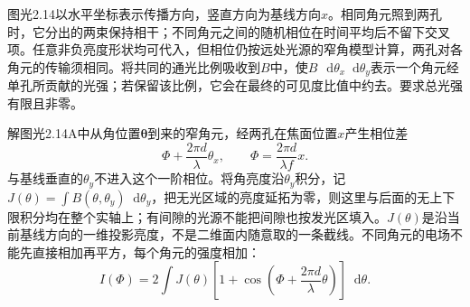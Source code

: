 \documentclass[UTF8,fontset=fandol,a4paper,11pt]{ctexart}
\newcommand{\dd}{\mathop{}\!\mathrm{d}}
\begin{document}
图光2.14以水平坐标表示传播方向，竖直方向为基线方向$x$。相同角元照到两孔时，它分出的两束保持相干；不同角元之间的随机相位在时间平均后不留下交叉项。任意非负亮度形状均可代入，但相位仍按远处光源的窄角模型计算，两孔对各角元的传输须相同。将共同的通光比例吸收到$B$中，使$B\,\dd\theta_x\dd\theta_y$表示一个角元经单孔所贡献的光强；若保留该比例，它会在最终的可见度比值中约去。要求总光强有限且非零。

解图光2.14A中从角位置$\boldsymbol\theta$到来的窄角元，经两孔在焦面位置$x$产生相位差
\[
\Phi+\frac{2\pi d}{\lambda}\theta_x,\qquad
\Phi=\frac{2\pi d}{\lambda f}x.
\]
与基线垂直的$\theta_y$不进入这个一阶相位。将角亮度沿$\theta_y$积分，记$J(\theta)=\int B(\theta,\theta_y)\dd\theta_y$，把无光区域的亮度延拓为零，则这里与后面的无上下限积分均在整个实轴上；有间隙的光源不能把间隙也按发光区填入。$J(\theta)$是沿当前基线方向的一维投影亮度，不是二维面内随意取的一条截线。不同角元的电场不能先直接相加再平方，每个角元的强度相加：
\[
I(\Phi)=2\int J(\theta)
\left[1+\cos\left(\Phi+\frac{2\pi d}{\lambda}\theta\right)\right]\dd\theta.
\]
\end{document}
